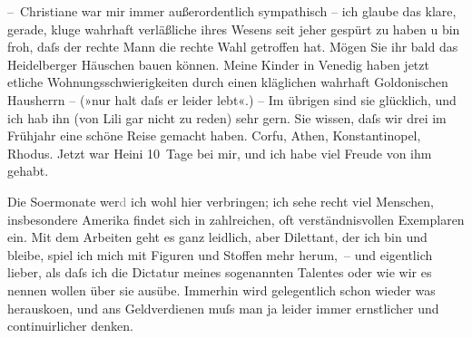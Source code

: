 \pstart
           – Christiane war mir immer außerordentlich
               sympathisch – ich glaube das klare, gerade, kluge wahrhaft verläßliche ihres Wesens
               seit jeher gespürt zu haben u bin froh, daſs der rechte Mann die rechte Wahl getroffen hat. Mögen
               Sie ihr bald das Heidelberger Häuschen bauen
               können. Meine Kinder in Venedig haben jetzt etliche
               Wohnungsschwierigkeiten durch einen kläglichen wahrhaft Goldonischen Hausherrn – (»nur halt daſs er leider lebt«.) – Im übrigen
               sind sie glücklich, und ich hab ihn (von Lili gar nicht zu reden) sehr
               gern. Sie wissen, daſs wir drei im Frühjahr eine schöne Reise gemacht haben. Corfu, Athen, Kon{\pb}stantinopel, Rhodus. Jetzt war Heini 10 Tage bei mir, und ich habe viel Freude
               von ihm gehabt.\pend
           
\pstart
           Die So{\geminationm}ermonate wer\textcolor{gray}{d} ich wohl hier
               verbringen; ich sehe recht viel Menschen, insbesondere Amerika findet sich in zahlreichen, oft verständnisvollen Exemplaren ein.
               Mit dem Arbeiten geht es ganz leidlich, aber Dilettant, der ich bin und bleibe, spiel
               ich mich mit Figuren und Stoffen mehr herum, – und eigentlich lieber, als daſs ich
               die Dictatur meines sogenannten Talentes oder wie wir es nennen wollen über sie
               ausübe. Immerhin wird gelegentlich schon wieder was herausko{\geminationm}en, und ans Geldverdienen muſs man ja leider immer
               ernstlicher und continuirlicher denken.\pend
           
